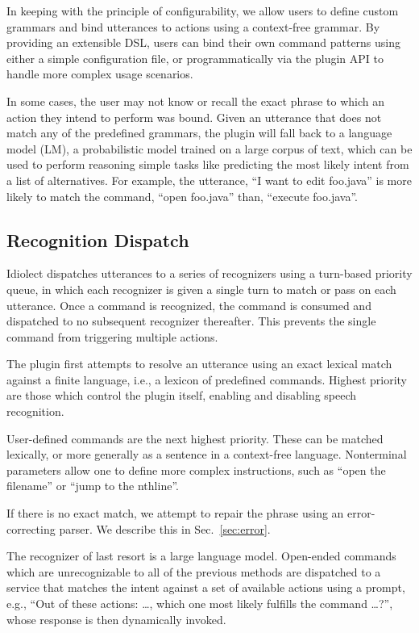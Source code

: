 \documentclass[conference]{IEEEtran}
\begin{document}
In keeping with the principle of configurability, we allow users to define custom grammars and bind utterances to actions using a context-free grammar. By providing an extensible DSL, users can bind their own command patterns using either a simple configuration file, or programmatically via the plugin API to handle more complex usage scenarios.

In some cases, the user may not know or recall the exact phrase to which an action they intend to perform was bound. Given an utterance that does not match any of the predefined grammars, the plugin will fall back to a language model (LM), a probabilistic model trained on a large corpus of text, which can be used to perform reasoning simple tasks like predicting the most likely intent from a list of alternatives. For example, the utterance, ``I want to edit foo.java'' is more likely to match the command, ``open foo.java'' than, ``execute foo.java''.

\subsection{Recognition Dispatch}

Idiolect dispatches utterances to a series of recognizers using a turn-based priority queue, in which each recognizer is given a single turn to match or pass on each utterance. Once a command is recognized, the command is consumed and dispatched to no subsequent recognizer thereafter. This prevents the single command from triggering multiple actions.

The plugin first attempts to resolve an utterance using an exact lexical match against a finite language, i.e., a lexicon of predefined commands. Highest priority are those which control the plugin itself, enabling and disabling speech recognition.

User-defined commands are the next highest priority. These can be matched lexically, or more generally as a sentence in a context-free language. Nonterminal parameters allow one to define more complex instructions, such as ``open the \textlangle filename'' or ``jump to the \textlangle nth\textrangle line''.

If there is no exact match, we attempt to repair the phrase using an error-correcting parser. We describe this in Sec.~\ref{sec:error}.

The recognizer of last resort is a large language model. Open-ended commands which are unrecognizable to all of the previous methods are dispatched to a service that matches the intent against a set of available actions using a prompt, e.g., ``Out of these actions: \ldots, which one most likely fulfills the command \ldots?'', whose response is then dynamically invoked.
\end{document}
